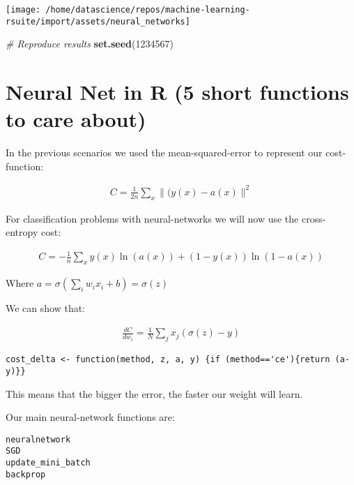 \documentclass[]{book}
\newenvironment{Shaded}{\begin{snugshade}}{\end{snugshade}}
\newcommand{\CommentTok}[1]{\textcolor[rgb]{0.56,0.35,0.01}{\textit{#1}}}
\newcommand{\DecValTok}[1]{\textcolor[rgb]{0.00,0.00,0.81}{#1}}
\newcommand{\KeywordTok}[1]{\textcolor[rgb]{0.13,0.29,0.53}{\textbf{#1}}}
\newcommand{\NormalTok}[1]{#1}
\begin{document}
\begin{center}\texttt{[image: /home/datascience/repos/machine-learning-rsuite/import/assets/neural\_networks]} \end{center}

\begin{Shaded}
\begin{Highlighting}[]
\CommentTok{# Reproduce results}
\KeywordTok{set.seed}\NormalTok{(}\DecValTok{1234567}\NormalTok{)}
\end{Highlighting}
\end{Shaded}

\hypertarget{neural-net-in-r-5-short-functions-to-care-about}{%
\section{Neural Net in R (5 short functions to care about)}\label{neural-net-in-r-5-short-functions-to-care-about}}

In the previous scenarios we used the mean-squared-error to represent our cost-function:

\[\begin{aligned} 
   C = \frac{1}{2n}\sum_x\|(y(x) - a(x)\|^2
\end{aligned}\]

For classification problems with neural-networks we will now use the cross-entropy cost:

\[\begin{aligned} 
   C = -\frac{1}{n}\sum_xy(x)\ln(a(x)) + (1 - y(x))\ln(1-a(x))
\end{aligned}\]

Where \(a=\sigma(\sum_iw_ix_i + b) = \sigma(z)\)

We can show that:

\[\begin{aligned} 
   \frac{dC}{dw_i} = \frac{1}{N}\sum_jx_j(\sigma(z)-y)
\end{aligned}\]

\begin{verbatim}
cost_delta <- function(method, z, a, y) {if (method=='ce'){return (a-y)}}
\end{verbatim}

This means that the bigger the error, the faster our weight will learn.

Our main neural-network functions are:

\begin{verbatim}
neuralnetwork 
SGD   
update_mini_batch 
backprop
\end{verbatim}
\end{document}
